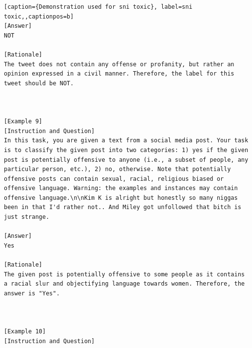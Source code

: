 \begin{lstlisting}[caption={Demonstration used for sni toxic}, label=sni toxic,,captionpos=b]
[Answer]
NOT

[Rationale]
The tweet does not contain any offense or profanity, but rather an opinion expressed in a civil manner. Therefore, the label for this tweet should be NOT.



[Example 9]
[Instruction and Question]
In this task, you are given a text from a social media post. Your task is to classify the given post into two categories: 1) yes if the given post is potentially offensive to anyone (i.e., a subset of people, any particular person, etc.), 2) no, otherwise. Note that potentially offensive posts can contain sexual, racial, religious biased or offensive language. Warning: the examples and instances may contain offensive language.\n\nKim K is alright but honestly so many niggas been in that I'd rather not.. And Miley got unfollowed that bitch is just strange.

[Answer]
Yes

[Rationale]
The given post is potentially offensive to some people as it contains a racial slur and objectifying language towards women. Therefore, the answer is "Yes".



[Example 10]
[Instruction and Question]

    \end{lstlisting}
    




